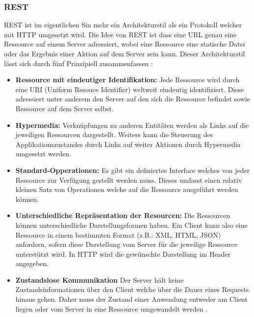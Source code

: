 \subsubsection{REST}
\label{sec:HTTP}
REST ist im eigentlichen Sin mehr ein Architekturstil als ein Protokoll welcher mit HTTP umgesetzt wird.
Die Idee von REST ist\R{,} dass eine URL genau eine Ressource auf einem Server adressiert, 
wobei eine Ressource eine statische Datei oder das Ergebnis einer Aktion auf dem Server sein kann.
Dieser Architekturstil lässt sich durch fünf Prinzipiell zusammenfassen :
\begin{itemize}
	\item \textbf{Ressource mit eindeutiger Identifikation:}
		Jede Ressource wird durch eine URI (Uniform Resouce Identifier) weltweit eindeutig identifiziert.
		Diese adressiert unter anderem den Server auf den sich die Ressource befindet sowie Ressource auf dem Server selbst.
	\item \textbf{Hypermedia:}
		Verknüpfungen zu anderen Entitäten werden als Links auf die jeweiligen Ressourcen dargestellt.
		Weiters kann die Steuerung des Applikationszustandes durch Links auf weiter Aktionen durch Hypermedia umgesetzt werden.
	\item \textbf{Standard-Opperationen:}
		Es gibt ein definiertes Interface welches von jeder Ressource zur Verfügung gestellt werden muss.
		Dieses umfasst einen relativ kleinen Satz von Operationen welche auf die Ressource ausgeführt werden können.
	\item \textbf{Unterschiedliche Repräsentation der Resourcen:}
		Die Ressourcen können unterschiedliche Darstellungsformen haben.
		Ein Client kann also eine Ressource in einem bestimmten Format (z.B.: XML, HTML, JSON) anfordern,
		sofern diese Darstellung vom Server für die jeweilige Ressource unterstützt wird.
		In HTTP wird die gewünschte Darstellung im Header angegeben.
	\item \textbf{Zustandslose Kommunikation}
		Der Server hält keine Zustandsinformationen über den Client welche über die Dauer eines Requests hinaus gehen.
		Daher muss der Zustand einer Anwendung entweder am Client liegen oder vom Server in eine Ressource umgewandelt werden \cite{rest}. 
\end{itemize}


